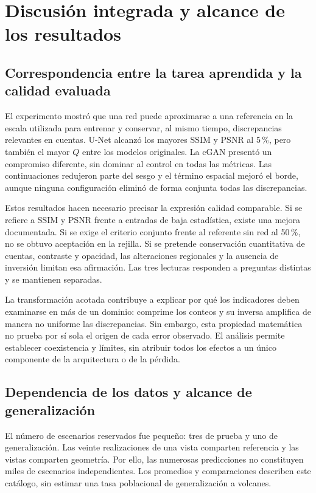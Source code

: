 \section{Discusión integrada y alcance de los resultados}\label{sec:res-discusion}
\subsection{Correspondencia entre la tarea aprendida y la calidad evaluada}
El experimento mostró que una red puede aproximarse a una referencia en la escala utilizada para entrenar y conservar, al mismo tiempo, discrepancias relevantes en cuentas. U-Net alcanzó los mayores SSIM y PSNR al 5\,\%, pero también el mayor $Q$ entre los modelos originales. La cGAN presentó un compromiso diferente, sin dominar al control en todas las métricas. Las continuaciones redujeron parte del sesgo y el término espacial mejoró el borde, aunque ninguna configuración eliminó de forma conjunta todas las discrepancias.

Estos resultados hacen necesario precisar la expresión calidad comparable. Si se refiere a SSIM y PSNR frente a entradas de baja estadística, existe una mejora documentada. Si se exige el criterio conjunto frente al referente sin red al 50\,\%, no se obtuvo aceptación en la rejilla. Si se pretende conservación cuantitativa de cuentas, contraste y opacidad, las alteraciones regionales y la ausencia de inversión limitan esa afirmación. Las tres lecturas responden a preguntas distintas y se mantienen separadas.

La transformación acotada contribuye a explicar por qué los indicadores deben examinarse en más de un dominio: comprime los conteos y su inversa amplifica de manera no uniforme las discrepancias. Sin embargo, esta propiedad matemática no prueba por sí sola el origen de cada error observado. El análisis permite establecer coexistencia y límites, sin atribuir todos los efectos a un único componente de la arquitectura o de la pérdida.

\subsection{Dependencia de los datos y alcance de generalización}
El número de escenarios reservados fue pequeño: tres de prueba y uno de generalización. Las veinte realizaciones de una vista comparten referencia y las vistas comparten geometría. Por ello, las numerosas predicciones no constituyen miles de escenarios independientes. Los promedios y comparaciones describen este catálogo, sin estimar una tasa poblacional de generalización a volcanes.

